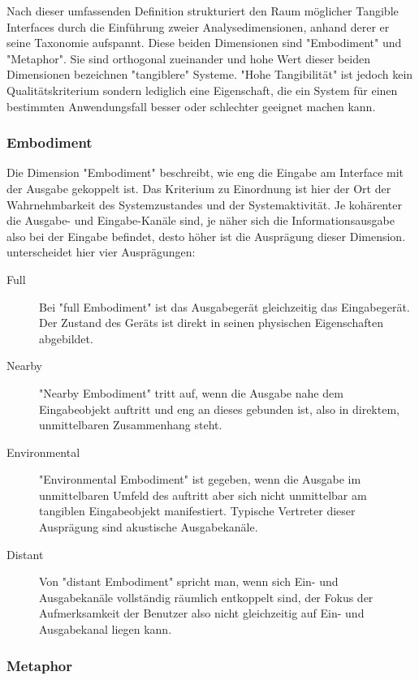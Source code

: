 Nach dieser umfassenden Definition strukturiert \citeauthor{Fishkin04} den Raum möglicher Tangible Interfaces durch die Einführung zweier Analysedimensionen, anhand derer er seine  Taxonomie aufspannt. Diese beiden Dimensionen sind "Embodiment" und "Metaphor". Sie sind orthogonal zueinander und hohe Wert dieser beiden Dimensionen bezeichnen "tangiblere" Systeme. "Hohe Tangibilität" ist jedoch kein Qualitätskriterium sondern lediglich eine Eigenschaft, die ein System für einen bestimmten Anwendungsfall besser oder schlechter geeignet machen kann.

\subsubsection{Embodiment}
Die Dimension "Embodiment" beschreibt, wie eng die Eingabe am Interface mit der Ausgabe gekoppelt ist. Das Kriterium zu Einordnung ist hier der Ort der Wahrnehmbarkeit des Systemzustandes und der Systemaktivität. Je kohärenter die Ausgabe- und Eingabe-Kanäle sind, je näher sich die Informationsausgabe also bei der Eingabe befindet, desto höher ist die Ausprägung dieser Dimension. \citeauthor{Fishkin04} unterscheidet hier vier Ausprägungen:
\begin{description}
 \item[Full] Bei "full Embodiment" ist das Ausgabegerät gleichzeitig das Eingabegerät. Der Zustand des Geräts ist direkt in seinen physischen Eigenschaften abgebildet.
 \item[Nearby] "Nearby Embodiment" tritt auf, wenn die Ausgabe nahe dem Eingabeobjekt auftritt und eng an dieses gebunden ist, also in direktem, unmittelbaren Zusammenhang steht. 
 \item[Environmental] "Environmental Embodiment" ist gegeben, wenn die Ausgabe im unmittelbaren Umfeld des auftritt aber sich nicht unmittelbar am tangiblen Eingabeobjekt manifestiert. Typische Vertreter dieser Ausprägung sind akustische Ausgabekanäle.
 \item[Distant] Von "distant Embodiment" spricht man, wenn sich Ein- und Ausgabekanäle vollständig räumlich entkoppelt sind, der Fokus der Aufmerksamkeit der Benutzer also nicht gleichzeitig auf Ein- und Ausgabekanal liegen kann. 
\end{description}

\subsubsection{Metaphor}

